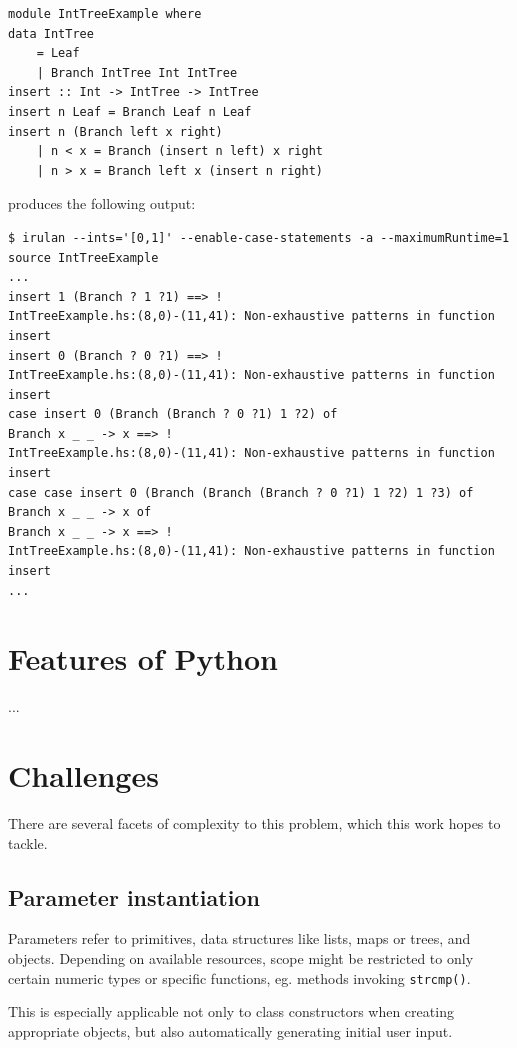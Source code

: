 \documentclass{icldt}
\numberwithin{equation}{section}       %
\begin{document}
\begin{lstlisting}[language=HaskellUlisses,frame=single]
module IntTreeExample where
data IntTree
	= Leaf
	| Branch IntTree Int IntTree
insert :: Int -> IntTree -> IntTree
insert n Leaf = Branch Leaf n Leaf
insert n (Branch left x right)
	| n < x = Branch (insert n left) x right
	| n > x = Branch left x (insert n right)
\end{lstlisting}

produces the following output:
\begin{lstlisting}[language=HaskellUlisses,frame=single]
$ irulan --ints='[0,1]' --enable-case-statements -a --maximumRuntime=1 source IntTreeExample
...
insert 1 (Branch ? 1 ?1) ==> !
IntTreeExample.hs:(8,0)-(11,41): Non-exhaustive patterns in function insert
insert 0 (Branch ? 0 ?1) ==> !
IntTreeExample.hs:(8,0)-(11,41): Non-exhaustive patterns in function insert
case insert 0 (Branch (Branch ? 0 ?1) 1 ?2) of
Branch x _ _ -> x ==> !
IntTreeExample.hs:(8,0)-(11,41): Non-exhaustive patterns in function insert
case case insert 0 (Branch (Branch (Branch ? 0 ?1) 1 ?2) 1 ?3) of
Branch x _ _ -> x of
Branch x _ _ -> x ==> !
IntTreeExample.hs:(8,0)-(11,41): Non-exhaustive patterns in function insert
...
\end{lstlisting}
\section{Features of Python}
\label{sect:python-features}
...
\section{Challenges}
\label{sect:challenges}
There are several facets of complexity to this problem, which this work hopes to tackle.
\subsection{Parameter instantiation}
Parameters refer to primitives, data structures like lists, maps or trees, and objects. Depending on available resources, scope might be restricted to only certain numeric types or specific functions, eg. methods invoking \texttt{strcmp()}.

This is especially applicable not only to class constructors when creating appropriate objects, but also automatically generating initial user input.
\end{document}
